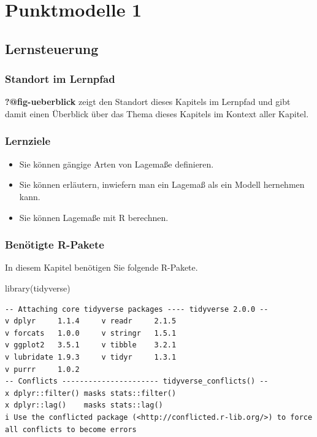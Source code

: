 \documentclass[
  letterpaper,
  DIV=11,
  numbers=noendperiod]{scrartcl}
\author{}
\date{}
\newenvironment{Shaded}{\begin{snugshade}}{\end{snugshade}}
\newcommand{\FunctionTok}[1]{\textcolor[rgb]{0.28,0.35,0.67}{#1}}
\newcommand{\NormalTok}[1]{\textcolor[rgb]{0.00,0.23,0.31}{#1}}
\providecommand{\tightlist}{%
  \setlength{\itemsep}{0pt}\setlength{\parskip}{0pt}}\usepackage{longtable,booktabs,array}
\theoremstyle{definition}
\theoremstyle{definition}
\theoremstyle{definition}
\theoremstyle{remark}
\begin{document}
\section{Punktmodelle 1}\label{sec-punktmodelle1}

\subsection{Lernsteuerung}\label{lernsteuerung}

\subsubsection{Standort im Lernpfad}\label{standort-im-lernpfad}

\textbf{?@fig-ueberblick} zeigt den Standort dieses Kapitels im Lernpfad
und gibt damit einen Überblick über das Thema dieses Kapitels im Kontext
aller Kapitel.

\subsubsection{Lernziele}\label{lernziele}

\begin{itemize}
\tightlist
\item
  Sie können gängige Arten von Lagemaße definieren.
\item
  Sie können erläutern, inwiefern man ein Lagemaß als ein Modell
  hernehmen kann.
\item
  Sie können Lagemaße mit R berechnen.
\end{itemize}

\subsubsection{Benötigte R-Pakete}\label{benuxf6tigte-r-pakete}

In diesem Kapitel benötigen Sie folgende R-Pakete.

\begin{Shaded}
\begin{Highlighting}[]
\FunctionTok{library}\NormalTok{(tidyverse)}
\end{Highlighting}
\end{Shaded}

\begin{verbatim}
-- Attaching core tidyverse packages ---- tidyverse 2.0.0 --
v dplyr     1.1.4     v readr     2.1.5
v forcats   1.0.0     v stringr   1.5.1
v ggplot2   3.5.1     v tibble    3.2.1
v lubridate 1.9.3     v tidyr     1.3.1
v purrr     1.0.2     
-- Conflicts ---------------------- tidyverse_conflicts() --
x dplyr::filter() masks stats::filter()
x dplyr::lag()    masks stats::lag()
i Use the conflicted package (<http://conflicted.r-lib.org/>) to force all conflicts to become errors
\end{verbatim}
\end{document}
